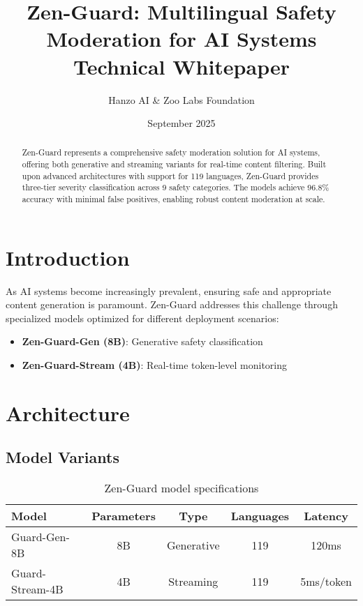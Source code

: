 \documentclass[11pt]{article}
\title{Zen-Guard: Multilingual Safety Moderation for AI Systems\\
\large Technical Whitepaper}
\author{Hanzo AI \& Zoo Labs Foundation}
\date{September 2025}
\begin{document}
\maketitle

\begin{abstract}
Zen-Guard represents a comprehensive safety moderation solution for AI systems, offering both generative and streaming variants for real-time content filtering. Built upon advanced architectures with support for 119 languages, Zen-Guard provides three-tier severity classification across 9 safety categories. The models achieve 96.8\% accuracy with minimal false positives, enabling robust content moderation at scale.
\end{abstract}

\section{Introduction}

As AI systems become increasingly prevalent, ensuring safe and appropriate content generation is paramount. Zen-Guard addresses this challenge through specialized models optimized for different deployment scenarios:

\begin{itemize}
\item \textbf{Zen-Guard-Gen (8B)}: Generative safety classification
\item \textbf{Zen-Guard-Stream (4B)}: Real-time token-level monitoring
\end{itemize}

\section{Architecture}

\subsection{Model Variants}

\begin{table}[h]
\centering
\begin{tabular}{lcccc}
\toprule
Model & Parameters & Type & Languages & Latency \\
\midrule
Guard-Gen-8B & 8B & Generative & 119 & 120ms \\
Guard-Stream-4B & 4B & Streaming & 119 & 5ms/token \\
\bottomrule
\end{tabular}
\caption{Zen-Guard model specifications}
\end{table}
\end{document}
